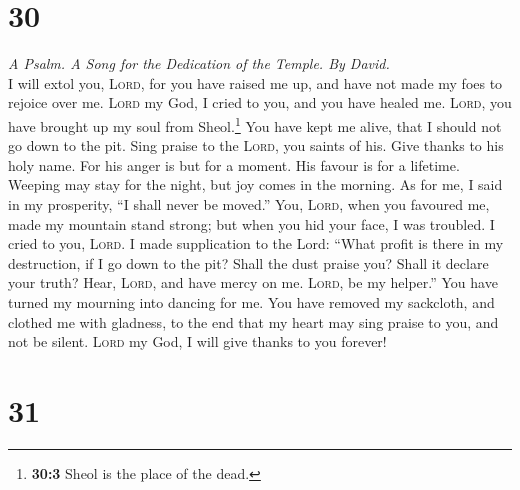\hypertarget{section-29}{%
\section{30}\label{section-29}}

\emph{A Psalm. A Song for the Dedication of the Temple. By David.}\\
 I will extol you, \textsc{Lord}, for you have raised me
up, and have not made my foes to rejoice over me. 
\textsc{Lord} my God, I cried to you, and you have healed me.
 \textsc{Lord}, you have brought up my soul from
Sheol.\footnote{\textbf{30:3} Sheol is the place of the dead.} You have
kept me alive, that I should not go down to the pit.  Sing
praise to the \textsc{Lord}, you saints of his. Give thanks to his holy
name.  For his anger is but for a moment. His favour is
for a lifetime. Weeping may stay for the night, but joy comes in the
morning.  As for me, I said in my prosperity, ``I shall
never be moved.''  You, \textsc{Lord}, when you favoured
me, made my mountain stand strong; but when you hid your face, I was
troubled.  I cried to you, \textsc{Lord}. I made
supplication to the Lord:  ``What profit is there in my
destruction, if I go down to the pit? Shall the dust praise you? Shall
it declare your truth?  Hear, \textsc{Lord}, and have
mercy on me. \textsc{Lord}, be my helper.''  You have
turned my mourning into dancing for me. You have removed my sackcloth,
and clothed me with gladness,  to the end that my heart
may sing praise to you, and not be silent. \textsc{Lord} my God, I will
give thanks to you forever!

\hypertarget{section-30}{%
\section{31}\label{section-30}}

